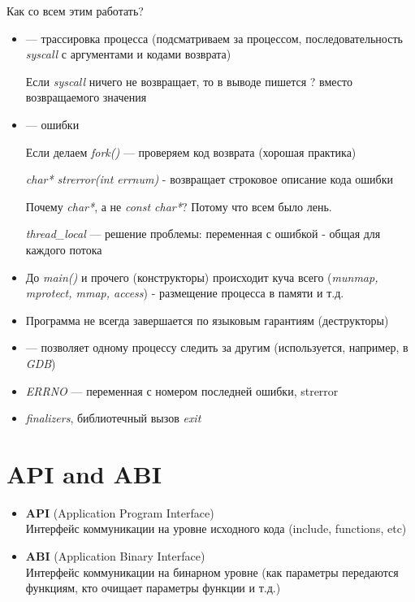 \documentclass[../../lectures.tex]{subfiles}
\begin{document}
Как со всем этим работать?
\begin{itemize}
    \item {} --- трассировка процесса (подсматриваем за процессом, 
          последовательность \emph{syscall} с аргументами и кодами возврата)

    Если \emph{syscall} ничего не возвращает, то в выводе пишется ? вместо возвращаемого значения

    \item {} --- ошибки

    Если делаем \emph{fork()} --- проверяем код возврата (хорошая практика)

    \emph{char* strerror(int errnum)} - возвращает строковое описание кода ошибки

    Почему \emph{char*}, а не \emph{const char*}? Потому что всем было лень.

    \emph{thread\_local} --- решение проблемы: переменная с ошибкой - общая для каждого потока

    \item До \emph{main()} и прочего (конструкторы) происходит куча всего 
          (\emph{munmap, mprotect, mmap, access}) - размещение процесса в памяти и т.д.

    \item Программа не всегда завершается по языковым гарантиям (деструкторы)

    \item {} --- позволяет одному процессу следить за другим (используется, например, в \emph{GDB})

    \item \emph{ERRNO} --- переменная с номером последней ошибки, strerror

    \item \emph{finalizers}, библиотечный вызов \emph{exit}
\end{itemize}

\section{API and ABI}
\begin{itemize}
    \item \textbf{API} (Application Program Interface)\\
          Интерфейс коммуникации на уровне исходного кода
          (include, functions, etc)
    \item \textbf{ABI} (Application Binary Interface)\\
          Интерфейс коммуникации на бинарном уровне
          (как параметры передаются функциям, кто очищает
          параметры функции и т.д.)
\end{itemize}
\end{document}
